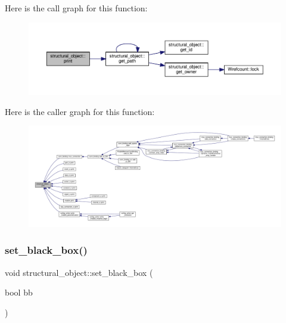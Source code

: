 Here is the call graph for this function\+:
\nopagebreak
\begin{figure}[H]
\begin{center}
\leavevmode
\includegraphics[width=350pt]{d8/da3/classstructural__object_a6770e169cf00f814a35b2939ec8f92eb_cgraph}
\end{center}
\end{figure}
Here is the caller graph for this function\+:
\nopagebreak
\begin{figure}[H]
\begin{center}
\leavevmode
\includegraphics[width=350pt]{d8/da3/classstructural__object_a6770e169cf00f814a35b2939ec8f92eb_icgraph}
\end{center}
\end{figure}
\mbox{\label{classstructural__object_a20aae199c4cd2f5d9877f753bb1426f8}} 
\subsubsection{\texorpdfstring{set\+\_\+black\+\_\+box()}{set\_black\_box()}}
{\footnotesize\ttfamily void structural\+\_\+object\+::set\+\_\+black\+\_\+box (\begin{DoxyParamCaption}\item[{bool}]{bb }\end{DoxyParamCaption})}



